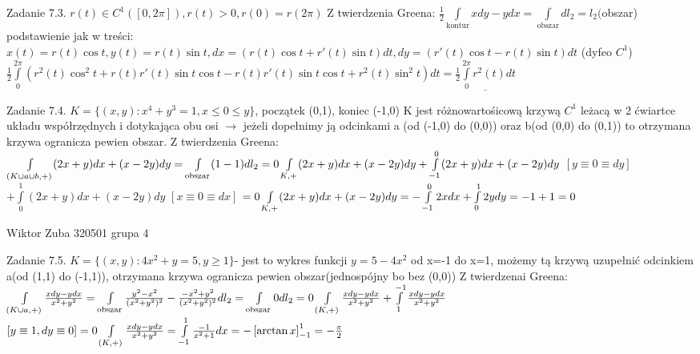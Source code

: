 \documentclass{article}
\begin{document}
Zadanie 7.3.
\newline
\newline
$r(t)\in C^1([0,2\pi]),r(t)>0,r(0)=r(2\pi)$ 
Z twierdzenia Greena:
$\frac{1}{2}\int\limits_{\text{kontur}}xdy-ydx=\int\limits_{\text{obszar}}dl_2=l_2($obszar)
podstawienie jak w treści:
$x(t)=r(t)\cos{t},y(t)=r(t)\sin{t},dx=(r(t)\cos{t}+r'(t)\sin{t})dt,dy=(r'(t)\cos{t}-r(t)\sin{t})dt$ (dyfeo $C^1$)\newline
$
\frac{1}{2}\int\limits_{0}^{2\pi}(r^2(t)\cos^2{t}+r(t)r'(t)\sin{t}\cos{t}-r(t)r'(t)\sin{t}\cos{t}+r^2(t)\sin^2{t})dt
=
\underline{\frac{1}{2}\int\limits_{0}^{2\pi}r^2(t)dt}
$
\newline
\newline

Zadanie 7.4.
\newline
\newline
$
K=\{(x,y):x^4+y^3=1,x\le0\le y\}
$, początek (0,1), koniec (-1,0)\newline
K jest różnowartośicową krzywą $C^1$ leżacą w 2 ćwiartce układu współrzędnych i dotykająca obu osi $\rightarrow$ jeżeli dopełnimy ją odcinkami a (od (-1,0) do (0,0))
oraz b(od (0,0) do (0,1)) to otrzymana krzywa ogranicza pewien obszar.
Z twierdzenia Greena:
$
\int\limits_{(K\cup a\cup b,+)}(2x+y)dx+(x-2y)dy=\int\limits_{\text{obszar}}(1-1)dl_2=0\newline
\int\limits_{K,+}(2x+y)dx+(x-2y)dy+\int\limits_{-1}^{0}(2x+y)dx+(x-2y)dy$ $[y\equiv0\equiv dy]$ $
+\int\limits_{0}^{1}(2x+y)dx+(x-2y)dy$ $[x\equiv0\equiv dx]$ $=0\newline
\int\limits_{K,+}(2x+y)dx+(x-2y)dy=-\int\limits_{-1}^{0}2xdx+\int\limits_{0}^{1}2ydy=-1+1=0
$
\newpage

Wiktor Zuba 320501 grupa 4
\newline

Zadanie 7.5.
\newline
\newline
$
K=\{(x,y):4x^2+y=5,y\ge 1\}$- jest to wykres funkcji $y=5-4x^2$ od x=-1 do x=1,
możemy tą krzywą uzupełnić odcinkiem a(od (1,1) do (-1,1)), otrzymana krzywa ogranicza pewien obszar(jednospójny bo bez (0,0))\newline
Z twierdzenai Greena:
$
\int\limits_{(K\cup a,+)}\frac{xdy-ydx}{x^2+y^2}=\int\limits_{\text{obszar}}\frac{y^2-x^2}{(x^2+y^2)^2}-\frac{-x^2+y^2}{(x^2+y^2)^2}dl_2
=\int\limits_{\text{obszar}}0dl_2=0\newline
\int\limits_{(K,+)}\frac{xdy-ydx}{x^2+y^2}+\int\limits_{1}^{-1}\frac{xdy-ydx}{x^2+y^2}$ $[y\equiv1,dy\equiv0]=0\newline
\int\limits_{(K,+)}\frac{xdy-ydx}{x^2+y^2}=\int\limits_{-1}^{1}\frac{-1}{x^2+1}dx
=
-\left[\arctan{x}\right]_{-1}^{1}=-\frac{\pi}{2}
$
\newline
\newline
\end{document}
